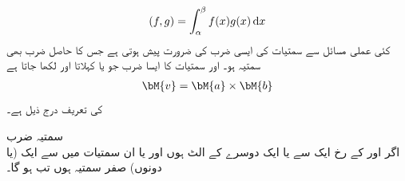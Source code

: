 \begin{align}
(f,g)=\int_{\alpha}^{\beta} f(x)g(x)\dif x
\end{align}
کئی عملی مسائل سے سمتیات کی ایسی ضرب کی ضرورت پیش ہوتی ہے جس کا حاصل ضرب  بھی سمتیہ ہو۔ اور  سمتیات کا ایسا ضرب جو  یا  کہلاتا اور  لکھا جاتا ہے
\begin{align*}
\bM{v}=\bM{a}\times \bM{b}
\end{align*}
کی تعریف درج ذیل ہے۔

\quad سمتیہ ضرب\\
اگر  اور  کے رخ ایک سے  یا  ایک دوسرے کے  الٹ ہوں اور یا ان سمتیات میں سے ایک (یا دونوں) صفر سمتیہ ہوں تب  ہو گا۔

